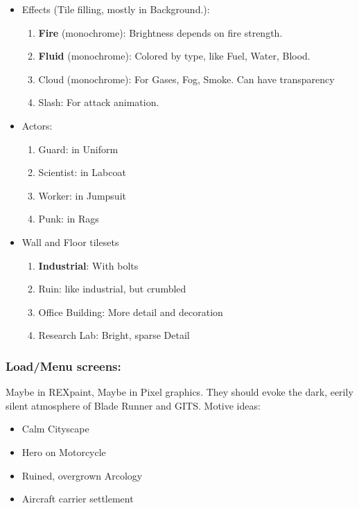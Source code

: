 \documentclass[11pt,a4paper, twocolumn]{article}
\begin{document}
\begin{itemize}
\begin{enumerate}
                \end{enumerate}
            \item Effects (Tile filling, mostly in Background.):
                \begin{enumerate}
                    \item \textbf{Fire} (monochrome): Brightness depends on fire strength.
                    \item \textbf{Fluid} (monochrome): Colored by type, like Fuel, Water, Blood.
                    \item Cloud (monochrome): For Gases, Fog, Smoke. Can have transparency
                    \item Slash: For attack animation.
                \end{enumerate}
            \item Actors:
                \begin{enumerate}
                    \item Guard: in Uniform
                    \item Scientist: in Labcoat
                    \item Worker: in Jumpsuit
                    \item Punk: in Rags
                \end{enumerate}
            \item Wall and Floor tilesets
                \begin{enumerate}
                    \item \textbf{Industrial}: With bolts
                    \item Ruin: like industrial, but crumbled
                    \item Office Building: More detail and decoration
                    \item Research Lab: Bright, sparse Detail
                \end{enumerate}
        \end{itemize}

\subsubsection*{Load/Menu screens:} Maybe in REXpaint, Maybe in Pixel graphics. They should evoke the dark, eerily
            silent atmosphere of Blade Runner and GITS. Motive ideas:
    \begin{itemize}
        \item Calm Cityscape
        \item Hero on Motorcycle
        \item Ruined, overgrown Arcology
        \item Aircraft carrier settlement
    \end{itemize}
\end{document}
